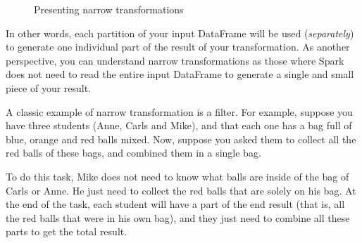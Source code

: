 \documentclass[
  11pt,
  letterpaper,
  DIV=11,
  numbers=noendperiod]{scrreprt}
\begin{document}
\begin{figure}


\caption{\label{fig-narrow-transformations}Presenting narrow
transformations}

\end{figure}%

In other words, each partition of your input DataFrame will be used
(\emph{separately}) to generate one individual part of the result of
your transformation. As another perspective, you can understand narrow
transformations as those where Spark does not need to read the entire
input DataFrame to generate a single and small piece of your result.

A classic example of narrow transformation is a filter. For example,
suppose you have three students (Anne, Carls and Mike), and that each
one has a bag full of blue, orange and red balls mixed. Now, suppose you
asked them to collect all the red balls of these bags, and combined them
in a single bag.

To do this task, Mike does not need to know what balls are inside of the
bag of Carls or Anne. He just need to collect the red balls that are
solely on his bag. At the end of the task, each student will have a part
of the end result (that is, all the red balls that were in his own bag),
and they just need to combine all these parts to get the total result.
\end{document}
